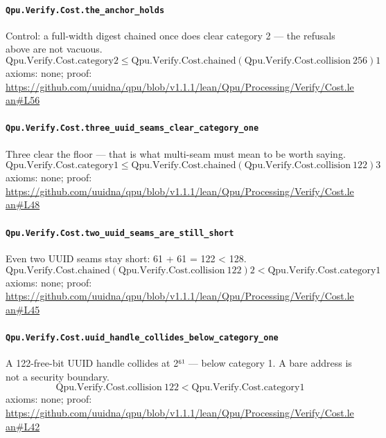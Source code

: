 \documentclass[11pt]{article}
\begin{document}
\paragraph{\texttt{Qpu.Verify.Cost.the\_anchor\_holds}}
Control: a full-width digest chained once does clear category 2 — the refusals above are not vacuous.
\[ \mathrm{Qpu.Verify.Cost.category2} \le \mathrm{Qpu.Verify.Cost.chained} (\mathrm{Qpu.Verify.Cost.collision}\ 256) 1 \]
\noindent axioms: none; proof: \url{https://github.com/uuidna/qpu/blob/v1.1.1/lean/Qpu/Processing/Verify/Cost.lean\#L56}

\paragraph{\texttt{Qpu.Verify.Cost.three\_uuid\_seams\_clear\_category\_one}}
Three clear the floor — that is what multi-seam must mean to be worth saying.
\[ \mathrm{Qpu.Verify.Cost.category1} \le \mathrm{Qpu.Verify.Cost.chained} (\mathrm{Qpu.Verify.Cost.collision}\ 122) 3 \]
\noindent axioms: none; proof: \url{https://github.com/uuidna/qpu/blob/v1.1.1/lean/Qpu/Processing/Verify/Cost.lean\#L48}

\paragraph{\texttt{Qpu.Verify.Cost.two\_uuid\_seams\_are\_still\_short}}
Even two UUID seams stay short: 61 + 61 = 122 < 128.
\[ \mathrm{Qpu.Verify.Cost.chained} (\mathrm{Qpu.Verify.Cost.collision}\ 122) 2 < \mathrm{Qpu.Verify.Cost.category1} \]
\noindent axioms: none; proof: \url{https://github.com/uuidna/qpu/blob/v1.1.1/lean/Qpu/Processing/Verify/Cost.lean\#L45}

\paragraph{\texttt{Qpu.Verify.Cost.uuid\_handle\_collides\_below\_category\_one}}
A 122-free-bit UUID handle collides at 2⁶¹ — below category 1. A bare address is not a security boundary.
\[ \mathrm{Qpu.Verify.Cost.collision}\ 122 < \mathrm{Qpu.Verify.Cost.category1} \]
\noindent axioms: none; proof: \url{https://github.com/uuidna/qpu/blob/v1.1.1/lean/Qpu/Processing/Verify/Cost.lean\#L42}
\end{document}
